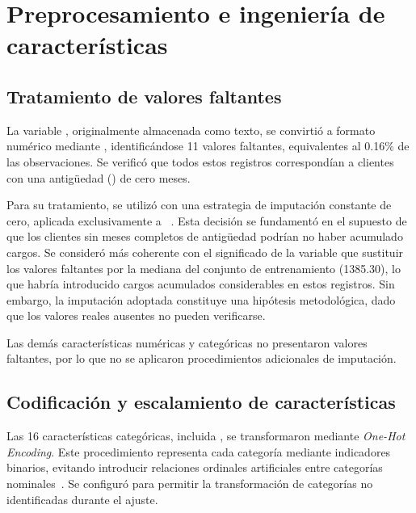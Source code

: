 \section{Preprocesamiento e ingeniería de características}
\label{sec:prepro}

\subsection{Tratamiento de valores faltantes}
La variable , originalmente almacenada como texto, se convirtió a formato numérico
mediante , identificándose 11 valores faltantes, equivalentes al
0.16\% de las observaciones. Se verificó que todos estos registros correspondían a clientes con una
antigüedad () de cero meses.

Para su tratamiento, se utilizó  con una estrategia de imputación constante de cero,
aplicada exclusivamente a ~\cite{simpleimputer}. Esta decisión se fundamentó en el
supuesto de que los clientes sin meses completos de antigüedad podrían no haber acumulado cargos. Se
consideró más coherente con el significado de la variable que sustituir los valores faltantes por la
mediana del conjunto de entrenamiento (1385.30), lo que habría introducido cargos acumulados
considerables en estos registros. Sin embargo, la imputación adoptada constituye una hipótesis
metodológica, dado que los valores reales ausentes no pueden verificarse.

Las demás características numéricas y categóricas no presentaron valores faltantes, por lo que no se
aplicaron procedimientos adicionales de imputación.

\subsection{Codificación y escalamiento de características}
Las 16 características categóricas, incluida , se transformaron mediante
\emph{One-Hot Encoding}. Este procedimiento representa cada categoría mediante indicadores binarios,
evitando introducir relaciones ordinales artificiales entre categorías nominales~\cite{onehot}. Se
configuró  para permitir la transformación de categorías no identificadas
durante el ajuste.

